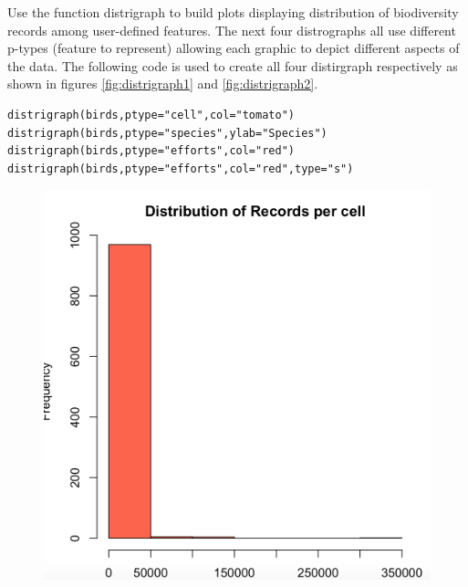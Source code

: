 Use the function distrigraph to build plots displaying distribution of biodiversity records among user-defined features.
The next four distrographs all use different p-types (feature to represent) allowing each graphic to depict different aspects of the data.
The following code is used to create all four distirgraph respectively as shown in figures \ref{fig:distrigraph1} and \ref{fig:distrigraph2}.

\begin{lstlisting}
distrigraph(birds,ptype="cell",col="tomato")
distrigraph(birds,ptype="species",ylab="Species")
distrigraph(birds,ptype="efforts",col="red")
distrigraph(birds,ptype="efforts",col="red",type="s")
\end{lstlisting}
\begin{figure}[htbp!]
    \centering
   \includegraphics[scale=0.35]{pictures/biodiversity/distrograph1.jpg}

\end{figure}
